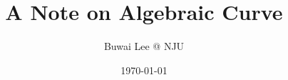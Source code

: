 \documentclass[12pt]{book}
\title{A Note on Algebraic Curve}
\author{Buwai Lee @ NJU}
\date{\today}
\theoremstyle{definition}
\theoremstyle{plain}
\begin{document}
\begin{titlepage}
	\maketitle
\end{titlepage}

\frontmatter
\tableofcontents
\mainmatter
	
\backmatter
\end{document}
